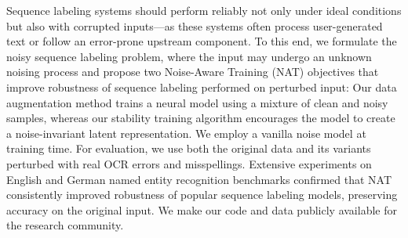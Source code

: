 Sequence labeling systems should perform reliably not only under ideal conditions but also with corrupted inputs---as these systems often process user-generated text or follow an error-prone upstream component. To this end, we formulate the noisy sequence labeling problem, where the input may undergo an unknown noising process and propose two Noise-Aware Training (NAT) objectives that improve robustness of sequence labeling performed on perturbed input: Our data augmentation method trains a neural model using a mixture of clean and noisy samples, whereas our stability training algorithm encourages the model to create a noise-invariant latent representation. We employ a vanilla noise model at training time. For evaluation, we use both the original data and its variants perturbed with real OCR errors and misspellings. Extensive experiments on English and German named entity recognition benchmarks confirmed that NAT consistently improved robustness of popular sequence labeling models, preserving accuracy on the original input. We make our code and data publicly available for the research community.
